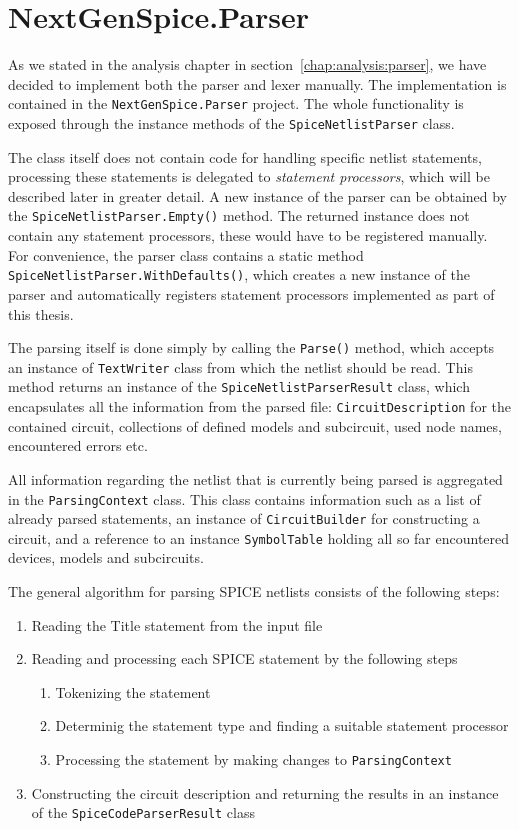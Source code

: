 \section{NextGenSpice.Parser}
As we stated in the analysis chapter in section~\ref{chap:analysis:parser}, we have decided to implement both the parser and lexer manually. The implementation is contained in the \texttt{NextGenSpice.Parser} project. The whole functionality is exposed through the instance methods of the \texttt{SpiceNetlistParser} class.

The class itself does not contain code for handling specific netlist statements, processing these statements is delegated to \textit{statement processors}, which will be described later in greater detail. A new instance of the parser can be obtained by the \texttt{SpiceNetlistParser.Empty()} method. The returned instance does not contain any statement processors, these would have to be registered manually. For convenience, the parser class contains a static method \texttt{SpiceNetlistParser\+.WithDefaults()}, which creates a new instance of the parser and automatically registers statement processors implemented as part of this thesis.

The parsing itself is done simply by calling the \texttt{Parse()} method, which accepts an instance of \texttt{TextWriter} class from which the netlist should be read. This method returns an instance of the \texttt{SpiceNetlistParser\+Result} class, which encapsulates all the information from the parsed file: \texttt{Circuit\+Description} for the contained circuit, collections of defined models and subcircuit, used node names, encountered errors etc.

All information regarding the netlist that is currently being parsed is aggregated in the \texttt{ParsingContext} class. This class contains information such as a list of already parsed statements, an instance of \texttt{CircuitBuilder} for constructing a circuit, and a reference to an instance \texttt{SymbolTable} holding all so far encountered devices, models and subcircuits.

The general algorithm for parsing SPICE netlists consists of the following steps:
\begin{enumerate}
	\item Reading the Title statement from the input file
	\item Reading and processing each SPICE statement by the following steps
	\begin{enumerate}
		\item Tokenizing the statement
		\item Determinig the statement type and finding a suitable statement processor
		\item Processing the statement by making changes to \texttt{ParsingContext}
	\end{enumerate}

	\item Constructing the circuit description and returning the results in an instance of the \texttt{SpiceCodeParserResult} class
\end{enumerate}


